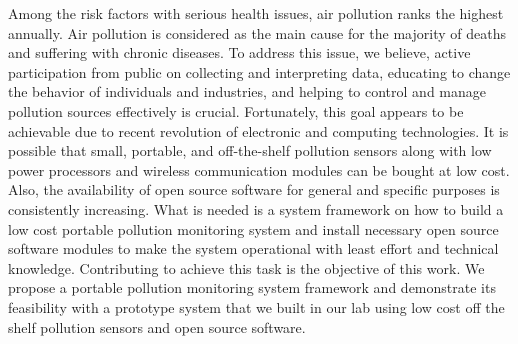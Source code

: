 \documentclass[a4paper,12pt,titlepage,oneside]{report}
\begin{document}
Among the risk factors with serious health issues, air
pollution ranks the highest annually. Air pollution is considered
as the main cause for the majority of deaths and suffering
with chronic diseases. To address this issue, we believe, active
participation from public on collecting and interpreting data,
educating to change the behavior of individuals and industries,
and helping to control and manage pollution sources effectively
is crucial. Fortunately, this goal appears to be achievable due to
recent revolution of electronic and computing technologies. It is
possible that small, portable, and off-the-shelf pollution sensors
along with low power processors and wireless communication
modules can be bought at low cost. Also, the availability of open
source software for general and specific purposes is consistently
increasing. What is needed is a system framework on how
to build a low cost portable pollution monitoring system and
install necessary open source software modules to make the
system operational with least effort and technical knowledge.
Contributing to achieve this task is the objective of this work.
We propose a portable pollution monitoring system framework
and demonstrate its feasibility with a prototype system that we
built in our lab using low cost off the shelf pollution sensors and
open source software.


\newpage
{} %
\tableofcontents

\newpage
{}   %
\listoftables

\newpage
{}   %
\listoffigures

\onehalfspacing
\newpage
{}  %
\end{document}
